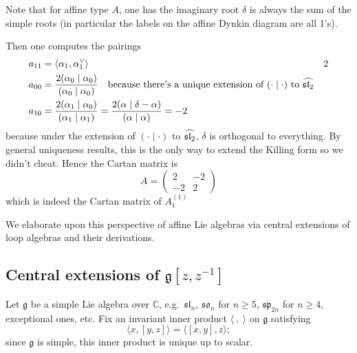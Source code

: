 \documentclass[12pt]{article}
\begin{document}
\begin{example}
    Note that for affine type $A$, one has the imaginary root $\delta$ is always the sum of the simple roots (in particular the labels on the affine Dynkin diagram are all 1's).

    Then one computes the pairings \begin{align*}
        a_{11} & = \langle \alpha_1, \alpha_1^\vee \rangle                                                                                                            & 2 \\
        a_{00} & = \frac{2(\alpha_0 \mid \alpha_0)}{(\alpha_0 \mid \alpha_0)} \texty{because there's a unique extension of $(\cdot \mid \cdot)$ to $\widehat{\sl_2}$}     \\
        a_{10} & = \frac{2(\alpha_1 \mid \alpha_0)}{(\alpha_1 \mid \alpha_1)} = \frac{2(\alpha \mid \delta - \alpha)}{(\alpha \mid \alpha)} = -2                          \\
    \end{align*} because under the extension of $(\cdot \mid \cdot)$ to $\widehat{\sl_2}$, $\delta$ is orthogonal to everything. By general uniqueness results, this is the only way to extend the Killing form so we didn't cheat. Hence the Cartan matrix is \[
        A = \begin{pmatrix}
            2  & -2 \\
            -2 & 2
        \end{pmatrix}
    \] which is indeed the Cartan matrix of $A_1^{(1)}$
\end{example}

We elaborate upon this perspective of affine Lie algebras via central extensions of loop algebras and their derivations.

\subsection*{Central extensions of $\mathfrak{g}[z,z^{-1}]$}

Let $\mathfrak{g}$ be a simple Lie algebra over $\mathbb{C}$, e.g.\ $\mathfrak{sl}_n$, $\mathfrak{so}_n$ for $n \geq 5$, $\mathfrak{sp}_{2n}$ for $n \geq 4$, exceptional ones, etc. Fix an invariant inner product $\langle\ ,\ \rangle$ on $\mathfrak{g}$ satisfying
\[
    \langle x, [y,z]\rangle = \langle [x,y], z\rangle;
\]
since $\mathfrak{g}$ is simple, this inner product is unique up to scalar.
\end{document}
